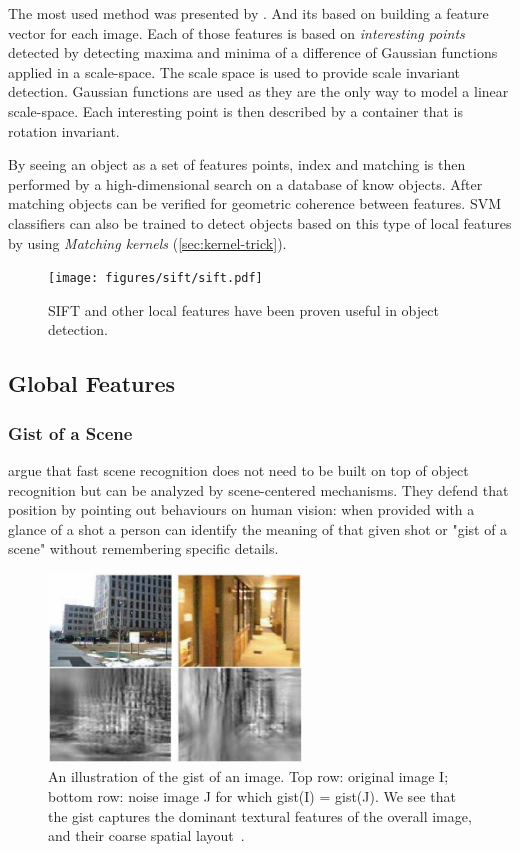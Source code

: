 The most used method was presented by \cite{lowe1999object}. And its based on
building a feature vector for each image. Each of those features is based on
\emph{interesting points} detected by detecting maxima and minima of a
difference of Gaussian functions applied in a scale-space.
The scale space is used to provide scale invariant detection. Gaussian functions
are used as they are the only way to model a linear scale-space.
Each interesting point is then described by a container that is rotation
invariant.

By seeing an object as a set of features points, index and matching is then
performed by a high-dimensional search on a database of know objects. After
matching objects can be verified for geometric coherence between features.
\Gls{SVM} classifiers can also be trained to detect objects based on this type
of local features by using \emph{Matching kernels} (\autoref{sec:kernel-trick}).

\begin{figure}[h]
    \texttt{[image: figures/sift/sift.pdf]}
    \caption{{SIFT} and other local features have been proven useful in object
             detection.}
\end{figure}


\subsection{Global Features}

\subsubsection{Gist of a Scene}
\label{sec:gist}
\cite{oliva2006building} argue that fast scene recognition does not need to be
built on top of object recognition but can be analyzed by scene-centered
mechanisms.
They defend that position by pointing out behaviours on human vision:
when provided with a glance of a shot a person can identify the meaning of that
given shot or "gist of a scene" without remembering specific details.

\begin{figure}[h]
\center
\includegraphics[width=0.60\textwidth]{figures/gist.jpg}
\caption{An illustration of the gist of an image. Top row: original image I;
         bottom row: noise image J for which gist(I) = gist(J). We see that the
         gist captures the dominant textural features of the overall image, and
         their coarse spatial layout~\citep{murphy2006object}.}
\end{figure}


